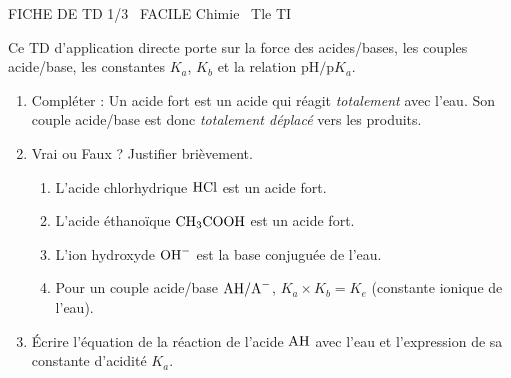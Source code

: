 \documentclass[11pt]{article}
\begin{document}
\begin{tcolorbox}[enhanced,colback=popink,colframe=popink,arc=10pt,boxrule=0pt,left=12pt,right=12pt,top=9pt,bottom=9pt]
{\color{white}\popxbold\small FICHE DE TD 1/3 \textbullet\ FACILE \hfill Chimie \textbullet\ Tle TI\par}
\end{tcolorbox}
\vspace{4pt}
Ce TD d'application directe porte sur la force des acides/bases, les couples acide/base, les constantes $K_a$, $K_b$ et la relation $\text{pH}/\text{p}K_a$.

\begin{exercice}
\begin{enumerate}
    \item Compléter : Un acide fort est un acide qui réagit \textit{totalement} avec l'eau. Son couple acide/base est donc \textit{totalement déplacé} vers les produits.
    \item Vrai ou Faux ? Justifier brièvement.
    \begin{enumerate}
        \item L'acide chlorhydrique $\ce{HCl}$ est un acide fort.
        \item L'acide éthanoïque $\ce{CH3COOH}$ est un acide fort.
        \item L'ion hydroxyde $\ce{OH-}$ est la base conjuguée de l'eau.
        \item Pour un couple acide/base $\ce{AH/A-}$, $K_a \times K_b = K_e$ (constante ionique de l'eau).
    \end{enumerate}
    \item Écrire l'équation de la réaction de l'acide $\ce{AH}$ avec l'eau et l'expression de sa constante d'acidité $K_a$.
\end{enumerate}
\end{exercice}
\end{document}
